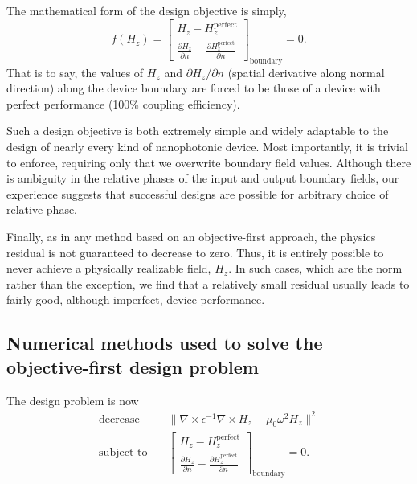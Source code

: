 \documentclass[letterpaper,10pt]{article}
\begin{document}
The mathematical form of the design objective is simply, 
    \begin{equation}
    f(H_z) = \begin{bmatrix}
        H_z - H_z^\text{perfect} \\
        \frac{\partial H_z}{\partial n} - 
            \frac{\partial H_z^\text{perfect}}{\partial n}
        \end{bmatrix}_\text{boundary}
        = 0.
    \end{equation}
That is to say,
    the values of $H_z$ and $\partial H_z / \partial n$
    (spatial derivative along normal direction)
    along the device boundary are forced to be 
    those of a device with perfect performance 
    (100\% coupling efficiency).
     
Such a design objective is both extremely simple and widely adaptable 
    to the design of nearly every kind of nanophotonic device.
Most importantly, it is trivial to enforce,
    requiring only that we overwrite boundary field values.
Although there is ambiguity in the relative phases of 
    the input and output boundary fields,
    our experience suggests that successful designs are possible for 
    arbitrary choice of relative phase.

Finally, as in any method based on an objective-first approach,
    the physics residual is not guaranteed to decrease to zero.
Thus, it is entirely possible to never achieve 
    a physically realizable field, $H_z$.
In such cases, which are the norm rather than the exception,
    we find that a relatively small residual usually leads to
    fairly good, although imperfect, device performance.
    
\subsection{Numerical methods used to solve the objective-first design problem}
The design problem is now
    \begin{subequations}\label{eq:act}
    \begin{align} 
    \text{decrease} & \quad  
        \| \nabla \times \epsilon^{-1} \nabla \times H_z - 
            \mu_0 \omega^2 H_z \|^2 \label{eq:act:obj} \\ 
    \text{subject to} & \quad 
        \begin{bmatrix}
        H_z - H_z^\text{perfect} \\
        \frac{\partial H_z}{\partial n} - 
            \frac{\partial H_z^\text{perfect}}{\partial n}
        \end{bmatrix}_\text{boundary}
        = 0.
    \end{align}
    \end{subequations}
\end{document}
